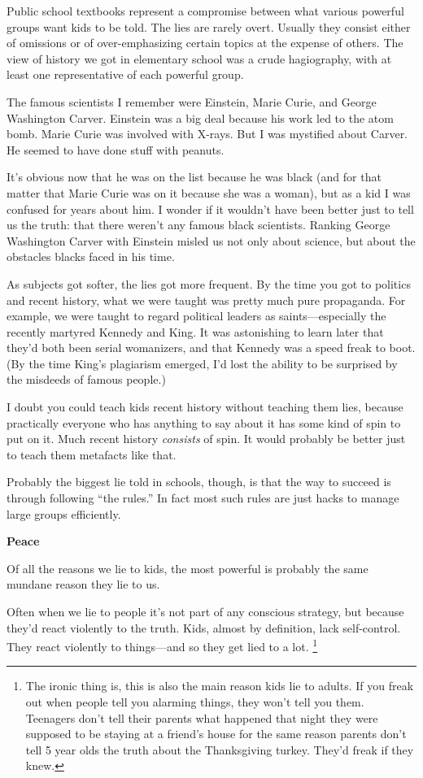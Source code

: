 \documentclass[12pt]{book}
\begin{document}
Public school textbooks represent a compromise between what various
powerful groups want kids to be told. The lies are rarely overt. Usually
they consist either of omissions or of over-emphasizing certain topics
at the expense of others. The view of history we got in elementary
school was a crude hagiography, with at least one representative of each
powerful group.

The famous scientists I remember were Einstein, Marie Curie, and George
Washington Carver. Einstein was a big deal because his work led to the
atom bomb. Marie Curie was involved with X-rays. But I was mystified
about Carver. He seemed to have done stuff with peanuts.

It's obvious now that he was on the list because he was black (and for
that matter that Marie Curie was on it because she was a woman), but as
a kid I was confused for years about him. I wonder if it wouldn't have
been better just to tell us the truth: that there weren't any famous
black scientists. Ranking George Washington Carver with Einstein misled
us not only about science, but about the obstacles blacks faced in his
time.

As subjects got softer, the lies got more frequent. By the time you got
to politics and recent history, what we were taught was pretty much pure
propaganda. For example, we were taught to regard political leaders as
saints---especially the recently martyred Kennedy and King. It was
astonishing to learn later that they'd both been serial womanizers, and
that Kennedy was a speed freak to boot. (By the time King's plagiarism
emerged, I'd lost the ability to be surprised by the misdeeds of famous
people.)

I doubt you could teach kids recent history without teaching them lies,
because practically everyone who has anything to say about it has some
kind of spin to put on it. Much recent history \emph{consists} of spin.
It would probably be better just to teach them metafacts like that.

Probably the biggest lie told in schools, though, is that the way to
succeed is through following ``the rules.'' In fact most such rules are
just hacks to manage large groups efficiently.

\textbf{Peace}

Of all the reasons we lie to kids, the most powerful is probably the
same mundane reason they lie to us.

Often when we lie to people it's not part of any conscious strategy, but
because they'd react violently to the truth. Kids, almost by definition,
lack self-control. They react violently to things---and so they get lied
to a lot. \footnote{The ironic thing is, this is also the main reason kids lie to
adults. If you freak out when people tell you alarming things, they
won't tell you them. Teenagers don't tell their parents what happened
that night they were supposed to be staying at a friend's house for the
same reason parents don't tell 5 year olds the truth about the
Thanksgiving turkey. They'd freak if they knew.}
\end{document}
